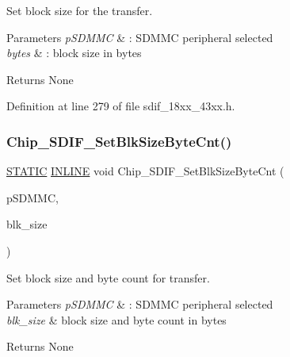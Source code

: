 Set block size for the transfer. 


\begin{DoxyParams}{Parameters}
{\em p\+S\+D\+M\+MC} & \+: S\+D\+M\+MC peripheral selected \\
\hline
{\em bytes} & \+: block size in bytes \\
\hline
\end{DoxyParams}
\begin{DoxyReturn}{Returns}
None 
\end{DoxyReturn}


Definition at line 279 of file sdif\+\_\+18xx\+\_\+43xx.\+h.

\mbox{\label{group___s_d_i_f__18_x_x__43_x_x_ga0599af26ab8f20447f3be5de625cc6c4}} 
\subsubsection{\texorpdfstring{Chip\+\_\+\+S\+D\+I\+F\+\_\+\+Set\+Blk\+Size\+Byte\+Cnt()}{Chip\_SDIF\_SetBlkSizeByteCnt()}}
{\footnotesize\ttfamily \hyperlink{group___l_p_c___types___public___macros_ga10b2d890d871e1489bb02b7e70d9bdfb}{S\+T\+A\+T\+IC} \hyperlink{spifi__18xx__43xx_8h_a2eb6f9e0395b47b8d5e3eeae4fe0c116}{I\+N\+L\+I\+NE} void Chip\+\_\+\+S\+D\+I\+F\+\_\+\+Set\+Blk\+Size\+Byte\+Cnt (\begin{DoxyParamCaption}\item[{\hyperlink{struct_l_p_c___s_d_m_m_c___t}{L\+P\+C\+\_\+\+S\+D\+M\+M\+C\+\_\+T} $\ast$}]{p\+S\+D\+M\+MC,  }\item[{uint32\+\_\+t}]{blk\+\_\+size }\end{DoxyParamCaption})}



Set block size and byte count for transfer. 


\begin{DoxyParams}{Parameters}
{\em p\+S\+D\+M\+MC} & \+: S\+D\+M\+MC peripheral selected \\
\hline
{\em blk\+\_\+size} & block size and byte count in bytes \\
\hline
\end{DoxyParams}
\begin{DoxyReturn}{Returns}
None 
\end{DoxyReturn}


